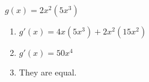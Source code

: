 {$g(x) = 2x^2(5x^3)$
}
{\begin{enumerate}
\item		$g'(x) = 4x(5x^3)+2x^2(15x^2)$
\item		$g'(x) = 50x^4$
\item		They are equal.
\end{enumerate}
}
